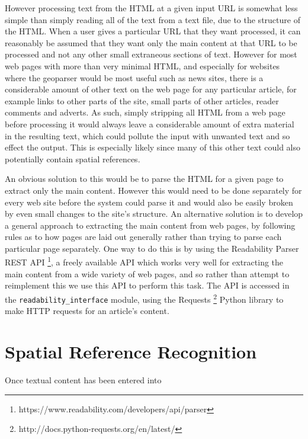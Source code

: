 \documentclass[12pt, a4paper]{report}
\begin{document}
However processing text from the HTML at a given input URL is somewhat less simple than simply reading all of the text from a text file, due to the structure of the HTML. When a user gives a particular URL that they want processed, it can reasonably be assumed that they want only the main content at that URL to be processed and not any other small extraneous sections of text. However for most web pages with more than very minimal HTML, and especially for websites where the geoparser would be most useful such as news sites, there is a considerable amount of other text on the web page for any particular article, for example links to other parts of the site, small parts of other articles, reader comments and adverts. As such, simply stripping all HTML from a web page before processing it would always leave a considerable amount of extra material in the resulting text, which could pollute the input with unwanted text and so effect the output. This is especially likely since many of this other text could also potentially contain spatial references.

An obvious solution to this would be to parse the HTML for a given page to extract only the main content. However this would need to be done separately for every web site before the system could parse it and would also be easily broken by even small changes to the site's structure. An alternative solution is to develop a general approach to extracting the main content from web pages, by following rules as to how pages are laid out generally rather than trying to parse each particular page separately. One way to do this is by using the Readability Parser REST API \footnote{https://www.readability.com/developers/api/parser}, a freely available API which works very well for extracting the main content from a wide variety of web pages, and so rather than attempt to reimplement this we use this API  to perform this task. The API is accessed in the \verb#readability_interface# module, using the Requests \footnote{http://docs.python-requests.org/en/latest/} Python library to make HTTP requests for an article's content.

\section{Spatial Reference Recognition}

Once textual content has been entered into

\end{document}
